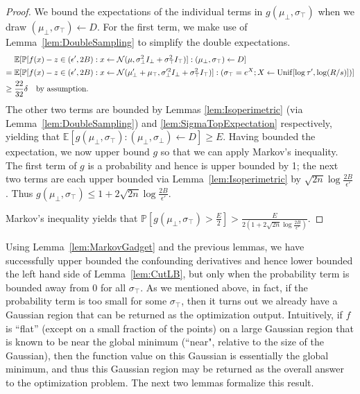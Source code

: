 \documentclass[11pt,letter]{article}
\renewcommand{\Pr}{\mathbb{P}}
\newcommand{\Exp}{\mathbb{E}}
\newcommand{\from}{\leftarrow}
\newcommand{\Normal}{\mathcal{N}}
\newcommand{\Unif}{\mathrm{Unif}}
\newcommand{\perr}{\delta}
\newcommand{\safety}{s}
\numberwithin{nTheorems}{section}
\begin{document}
\begin{proof}
We bound the expectations of the individual terms in $g(\mu_\bot,\sigma_\top)$ when we draw $(\mu_\bot,\sigma_\top)\from D$.
For the first term, we make use of Lemma~\ref{lem:DoubleSampling} to simplify the double expectations.
\begin{align*}
&\Exp[\Pr[f(x)-z \in (\epsilon',2B) : x \from \Normal(\mu, \sigma_\bot^2 I_\bot+\sigma_\top^2 I_\top)] : (\mu_\bot, \sigma_\top) \from D]\\
=\;&\Exp[\Pr[f(x)-z \in (\epsilon',2B) : x \from \Normal(\mu_\bot' + \mu_\top, \sigma_\bot'^2 I_\bot + \sigma_\top^2 I_\top)] : (\sigma_\top = e^X; X \from \Unif[\log \tau', \log (R/\safety)])]\\
\ge\;& \frac{22}{32}\perr \text{\quad by assumption.}
\end{align*}
The other two terms are bounded by Lemmas \ref{lem:Isoperimetric} (via Lemma~\ref{lem:DoubleSampling}) and \ref{lem:SigmaTopExpectation} respectively, yielding that $\Exp[g(\mu_\bot, \sigma_\top):(\mu_\bot, \sigma_\bot) \from D]\ge E$. Having bounded the expectation, we now upper bound $g$ so that we can apply Markov's inequality. The first term of $g$ is a probability and hence is upper bounded by 1; the next two terms are each upper bounded via Lemma~\ref{lem:Isoperimetric} by $\sqrt{2n}\log\frac{2B}{\epsilon'}$. Thus $g(\mu_\bot, \sigma_\top)\leq 1+2\sqrt{2n}\log\frac{2B}{\epsilon'}$.

Markov's inequality yields that $\Pr[g(\mu_\bot, \sigma_\top)>\frac{E}{2}]>\frac{E}{2(1+2\sqrt{2n}\log\frac{2B}{\epsilon'})}$.
\end{proof}

Using Lemma~\ref{lem:MarkovGadget} and the previous lemmas, we have successfully upper bounded the confounding derivatives and hence lower bounded the left hand side of Lemma~\ref{lem:CutLB}, but only when the probability term is bounded away from 0 for all $\sigma_\top$.
As we mentioned above, in fact, if the probability term is too small for some $\sigma_\top$, then it turns out we already have a Gaussian region that can be returned as the optimization output.
Intuitively, if $f$ is ``flat'' (except on a small fraction of the points) on a large Gaussian region that is known to be near the global minimum (``near", relative to the size of the Gaussian), then the function value on this Gaussian is essentially the global minimum, and thus this Gaussian region may be returned as the overall answer to the optimization problem.
The next two lemmas formalize this result.
\end{document}
